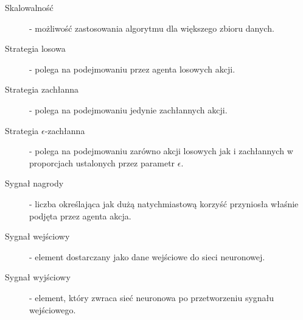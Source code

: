 \documentclass[12pt]{book}
\theoremstyle{plain}
\begin{document}
\begin{description}
	\item[Skalowalność] - możliwość zastosowania algorytmu dla większego zbioru danych.
	\item[Strategia losowa] - polega na podejmowaniu przez agenta losowych akcji.
	\item[Strategia zachłanna]- polega na podejmowaniu jedynie zachłannych akcji.
	\item[Strategia $\epsilon$-zachłanna] - polega na podejmowaniu zarówno akcji losowych jak i zachłannych w proporcjach ustalonych przez parametr $\epsilon$.
	\item[Sygnał nagrody] - liczba określająca jak dużą natychmiastową korzyść przyniosła właśnie podjęta przez agenta akcja.
	\item[Sygnał wejściowy] - element dostarczany jako dane wejściowe do sieci neuronowej.
	\item[Sygnał wyjściowy] - element, który zwraca sieć neuronowa po przetworzeniu sygnału wejściowego.
	
\end{description}
\end{document}
